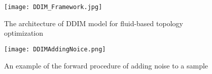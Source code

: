 \documentclass{article}
\begin{document}
\begin{figure}
    \centering
    \texttt{[image: DDIM\_Framework.jpg]}
    \caption{The architecture of DDIM model for fluid-based topology optimization}
    \label{fig::DDIM}
\end{figure}
\begin{figure*}\label{AddNoise}
    \centering
    \texttt{[image: DDIMAddingNoice.png]}
    \caption{An example of the forward procedure of adding noise to a sample}
    \label{fig::AddNoiceSample}
\end{figure*}
\end{document}
